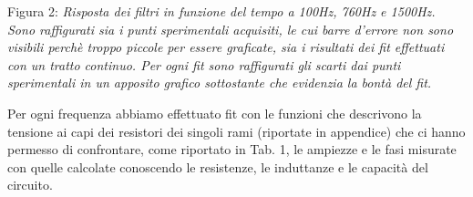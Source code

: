 \documentclass[]{article}
\begin{document}
\begin{center}Figura 2: \emph{Risposta dei filtri in funzione del tempo a 100Hz, 760Hz e 1500Hz. Sono raffigurati sia i punti sperimentali acquisiti, le cui barre d'errore non sono visibili perchè troppo piccole per essere graficate, sia i risultati dei fit effettuati con un tratto continuo. Per ogni fit sono raffigurati gli scarti dai punti sperimentali in un apposito grafico sottostante che evidenzia la bontà del fit.}\\
	\end{center}

\newpage
Per ogni frequenza abbiamo effettuato fit con le funzioni che descrivono la tensione ai capi dei resistori dei singoli rami (riportate in appendice) che ci hanno permesso di confrontare, come riportato in Tab. 1, le ampiezze e le fasi misurate con quelle calcolate conoscendo le resistenze, le induttanze e le capacità del circuito.\\

\\

\\

 \\
\end{document}
